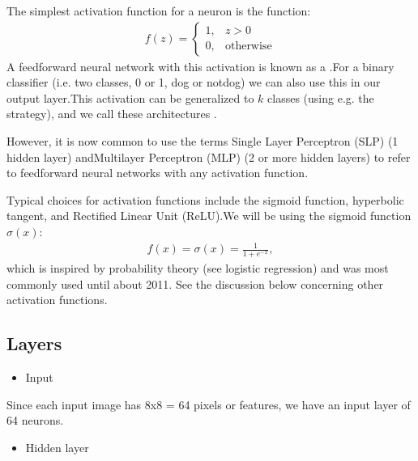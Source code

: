 \documentclass[letterpaper,10pt,english]{sphinxmanual}
\begin{document}
The simplest activation function for a neuron is the  function:
\begin{equation*}
\begin{split} f(z) = 
\begin{cases}
1,  &  z > 0\\
0,  & \text{otherwise}
\end{cases}
\end{split}
\end{equation*}
A feed\sphinxhyphen{}forward neural network with this activation is known as a .For a binary classifier (i.e. two classes, 0 or 1, dog or not\sphinxhyphen{}dog) we can also use this in our output layer.This activation can be generalized to \(k\) classes (using e.g. the  strategy),
and we call these architectures .

However, it is now common to use the terms Single Layer Perceptron (SLP) (1 hidden layer) andMultilayer Perceptron (MLP) (2 or more hidden layers) to refer to feed\sphinxhyphen{}forward neural networks with any activation function.

Typical choices for activation functions include the sigmoid function, hyperbolic tangent, and Rectified Linear Unit (ReLU).We will be using the sigmoid function \(\sigma(x)\):
\begin{equation*}
\begin{split} f(x) = \sigma(x) = \frac{1}{1 + e^{-x}} ,\end{split}
\end{equation*}
which is inspired by probability theory (see logistic regression) and was most commonly used until about 2011. See the discussion below concerning other activation functions.


\subsection{Layers}
\label{\detokenize{chapter6:layers}}\begin{itemize}
\item {} 
Input

\end{itemize}

Since each input image has 8x8 = 64 pixels or features, we have an input layer of 64 neurons.
\begin{itemize}
\item {} 
Hidden layer

\end{itemize}
\end{document}
